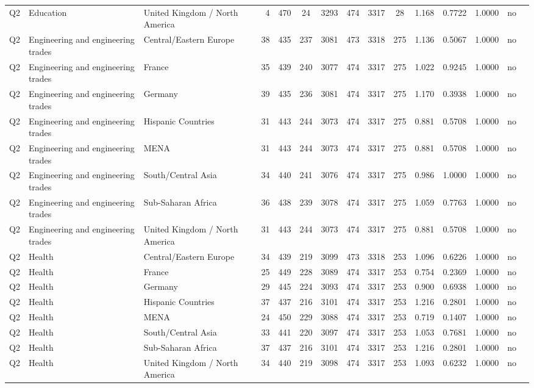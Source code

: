 \begin{longtable}{lllrcccccccccll}
Q2 & Education & United Kingdom / North America & 4 & 470 & 24 & 3293 & 474 & 3317 & 28 & 1.168 & 0.7722 & 1.0000 & no \\
Q2 & Engineering and engineering trades & Central/Eastern Europe & 38 & 435 & 237 & 3081 & 473 & 3318 & 275 & 1.136 & 0.5067 & 1.0000 & no \\
Q2 & Engineering and engineering trades & France & 35 & 439 & 240 & 3077 & 474 & 3317 & 275 & 1.022 & 0.9245 & 1.0000 & no \\
Q2 & Engineering and engineering trades & Germany & 39 & 435 & 236 & 3081 & 474 & 3317 & 275 & 1.170 & 0.3938 & 1.0000 & no \\
Q2 & Engineering and engineering trades & Hispanic Countries & 31 & 443 & 244 & 3073 & 474 & 3317 & 275 & 0.881 & 0.5708 & 1.0000 & no \\
Q2 & Engineering and engineering trades & MENA & 31 & 443 & 244 & 3073 & 474 & 3317 & 275 & 0.881 & 0.5708 & 1.0000 & no \\
Q2 & Engineering and engineering trades & South/Central Asia & 34 & 440 & 241 & 3076 & 474 & 3317 & 275 & 0.986 & 1.0000 & 1.0000 & no \\
Q2 & Engineering and engineering trades & Sub-Saharan Africa & 36 & 438 & 239 & 3078 & 474 & 3317 & 275 & 1.059 & 0.7763 & 1.0000 & no \\
Q2 & Engineering and engineering trades & United Kingdom / North America & 31 & 443 & 244 & 3073 & 474 & 3317 & 275 & 0.881 & 0.5708 & 1.0000 & no \\
Q2 & Health & Central/Eastern Europe & 34 & 439 & 219 & 3099 & 473 & 3318 & 253 & 1.096 & 0.6226 & 1.0000 & no \\
Q2 & Health & France & 25 & 449 & 228 & 3089 & 474 & 3317 & 253 & 0.754 & 0.2369 & 1.0000 & no \\
Q2 & Health & Germany & 29 & 445 & 224 & 3093 & 474 & 3317 & 253 & 0.900 & 0.6938 & 1.0000 & no \\
Q2 & Health & Hispanic Countries & 37 & 437 & 216 & 3101 & 474 & 3317 & 253 & 1.216 & 0.2801 & 1.0000 & no \\
Q2 & Health & MENA & 24 & 450 & 229 & 3088 & 474 & 3317 & 253 & 0.719 & 0.1407 & 1.0000 & no \\
Q2 & Health & South/Central Asia & 33 & 441 & 220 & 3097 & 474 & 3317 & 253 & 1.053 & 0.7681 & 1.0000 & no \\
Q2 & Health & Sub-Saharan Africa & 37 & 437 & 216 & 3101 & 474 & 3317 & 253 & 1.216 & 0.2801 & 1.0000 & no \\
Q2 & Health & United Kingdom / North America & 34 & 440 & 219 & 3098 & 474 & 3317 & 253 & 1.093 & 0.6232 & 1.0000 & no \\

\end{longtable}
